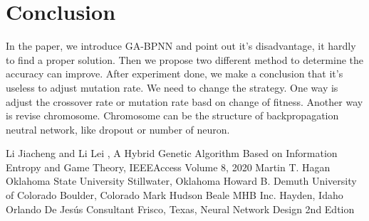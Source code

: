 \documentclass[conference]{IEEEtran}
\begin{document}
\section{Conclusion}
In the paper, we introduce GA-BPNN and point out it's disadvantage, it hardly to find a proper solution. Then we propose two different method to determine the accuracy can improve. After experiment done, we make a conclusion that it's useless to adjust mutation rate. We need to change the strategy. One way is adjust the crossover rate or mutation rate basd on change of fitness. Another way is revise chromosome. Chromosome can be the structure of backpropagation neutral network, like dropout or number of neuron.

\begin{thebibliography}{00}
 Li Jiacheng and Li Lei
, A Hybrid Genetic Algorithm Based on Information Entropy and Game Theory, IEEEAccess Volume 8, 2020
 Martin T. Hagan Oklahoma State University Stillwater, Oklahoma Howard B. Demuth University of Colorado Boulder, Colorado Mark Hudson Beale MHB Inc. Hayden, Idaho Orlando De Jesús Consultant Frisco, Texas, Neural Network Design 2nd Edtion 

\end{thebibliography}
\vspace{12pt}
\end{document}
